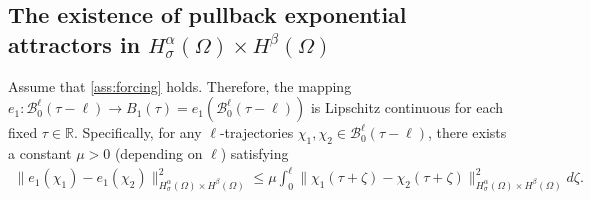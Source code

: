 \documentclass[oneside,preprint,12pt,numbers,sort&compress]{elsarticle}
\begin{document}
\subsection{The existence of pullback exponential attractors in \texorpdfstring{$H_\sigma^{\alpha}(\Omega) \times H^{\beta}(\Omega)$}{HH}}\label{subsec0402}
\begin{lemma}\label{lem0403}
Assume that \cref{ass:forcing} holds. Therefore, the mapping $e_1: \mathcal{B}_0^\ell(\tau-\ell) \to B_1(\tau)=e_1(\mathcal{B}_0^\ell(\tau-\ell))$ is Lipschitz continuous for each fixed $\tau \in \mathbb{R}$. Specifically, for any $\ell$-trajectories $\chi_1, \chi_2 \in \mathcal{B}_0^\ell(\tau-\ell)$, there exists a constant $\mu > 0 $ (depending on $\ell$) satisfying
\begin{align*}
\| e_{1}(\chi_{1}) - e_{1}(\chi_{2}) \|_{H_\sigma^{\alpha}(\Omega) \times H^{\beta}(\Omega)}^{2} 
\leq
\mu
\int_{0}^{\ell}
\| \chi_{1}(\tau+\zeta) - \chi_{2}(\tau+\zeta) \|_{H_\sigma^{\alpha}(\Omega) \times H^{\beta}(\Omega)}^{2} 
d\zeta.
\end{align*}
\end{lemma}
\end{document}
